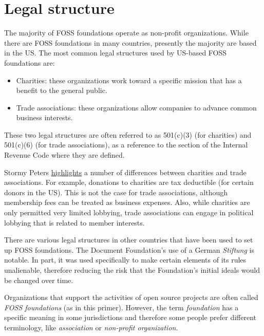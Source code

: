 


\chapter{Legal structure}

The majority of FOSS foundations operate as non-profit organizations.  While there are FOSS foundations in many countries, presently the majority are based in the US.  The most common legal structures used by US-based FOSS foundations are:

\begin{itemize}

\itemsep 0.50em

\item Charities: these organizations work toward a specific mission that has a benefit to the general public.

\item Trade associations: these organizations allow companies to advance common business interests.

\end {itemize}

These two legal structures are often referred to as 501(c)(3) (for charities) and 501(c)(6) (for trade associations), as a reference to the section of the Internal Revenue Code where they are defined.

Stormy Peters \href{http://stormyscorner.com/2008/08/501c-3-versus-6.html}{highlights} a number of differences between charities and trade associations.  For example, donations to charities are tax deductible (for certain donors in the US).  This is not the case for trade associations, although membership fees can be treated as business expenses.  Also, while charities are only permitted very limited lobbying, trade associations can engage in political lobbying that is related to member interests.

There are various legal structures in other countries that have been used to set up FOSS foundations.  The Document Foundation's use of a German \textit{Stiftung} is notable.  In part, it was used specifically to make certain elements of its rules unalienable, therefore reducing the risk that the Foundation's initial ideals would be changed over time.

\begin{kaobox}[frametitle=FOSS foundations: what's in a name?]

Organizations that support the activities of open source projects are often called \textit{FOSS foundations} (as in this primer).  However, the term \textit{foundation} has a specific meaning in some jurisdictions and therefore some people prefer different terminology, like \textit{association} or \textit{non-profit organization}.

\end{kaobox}

